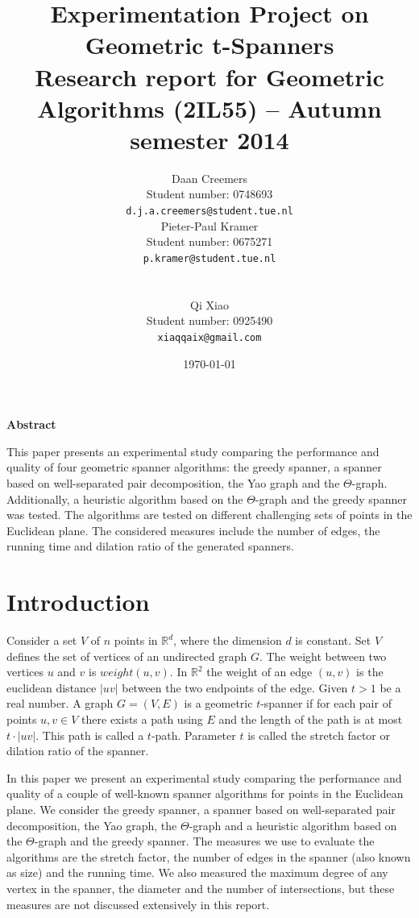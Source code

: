 \documentclass[a4paper,twoside,11pt,hidelinks]{article}
\title{\sffamily\bfseries
Experimentation Project on Geometric t-Spanners \\[1ex]
%
\large Research report for Geometric Algorithms (2IL55) -- Autumn
semester 2014}
\author{
  \begin{minipage}[t]{.5\linewidth}
    \centering
    Daan Creemers \\
    Student number: 0748693 \\
    \texttt{d.j.a.creemers@student.tue.nl}
  \end{minipage}
  \begin{minipage}[t]{.5\linewidth}
    \centering
    Pieter-Paul Kramer \\
    Student number: 0675271 \\
    \texttt{p.kramer@student.tue.nl}
  \end{minipage}
  \\
  \begin{minipage}[t]{.5\linewidth}
    \centering
    \vspace{1em}
    Qi Xiao \\
    Student number: 0925490 \\
    \texttt{xiaqqaix@gmail.com}
  \end{minipage}
}
\date{\today}
\theoremstyle{plain}
\theoremstyle{definition}  %
\newcommand{\indented}[2] {
\begingroup
\leftskip#1
\rightskip\leftskip
#2
\par
\endgroup
}
\begin{document}
\maketitle
\indented{1.6cm} {
 \begin{center}\textbf{Abstract}\end{center}
    This paper presents an experimental study comparing the performance and quality of four geometric spanner algorithms: the greedy spanner, a spanner based on well-separated pair decomposition, the Yao graph and the $\Theta$-graph. Additionally, a heuristic algorithm based on the $\Theta$-graph and the greedy spanner was tested. The algorithms are tested on different challenging sets of points in the Euclidean plane. The considered measures include the number of edges, the running time and dilation ratio of the generated spanners.
}

\section{Introduction}
\label{sec:introduction}

Consider a set $V$ of $n$ points in $\mathbb{R}^{d}$, where the dimension $d$ is constant. Set $V$ defines the set of vertices of an undirected graph $G$. The weight between two vertices $u$ and $v$ is $weight(u,v)$. In $\mathbb{R}^{2}$ the  weight of an edge $(u,v)$ is the euclidean distance $|uv|$ between the two endpoints of the edge. Given $t>1$ be a real number. A graph $G=(V,E)$ is a geometric $t$-spanner if for each pair of points $u,v \in V$ there exists a path using $E$ and the length of the path is at most $t\cdot |uv|$. This path is called a $t$-path. Parameter $t$ is called the stretch factor or dilation ratio of the spanner.

In this paper we present an experimental study comparing the performance and quality of a couple of well-known spanner algorithms for points in the Euclidean plane. We consider the greedy spanner, a spanner based on well-separated pair decomposition, the Yao graph, the $\Theta$-graph and a heuristic algorithm based on the $\Theta$-graph and the greedy spanner. The measures we use to evaluate the algorithms are the stretch factor, the number of edges in the spanner (also known as size) and the running time. We also measured the maximum degree of any vertex in the spanner, the diameter and the number of intersections, but these measures are not discussed extensively in this report.
\end{document}
